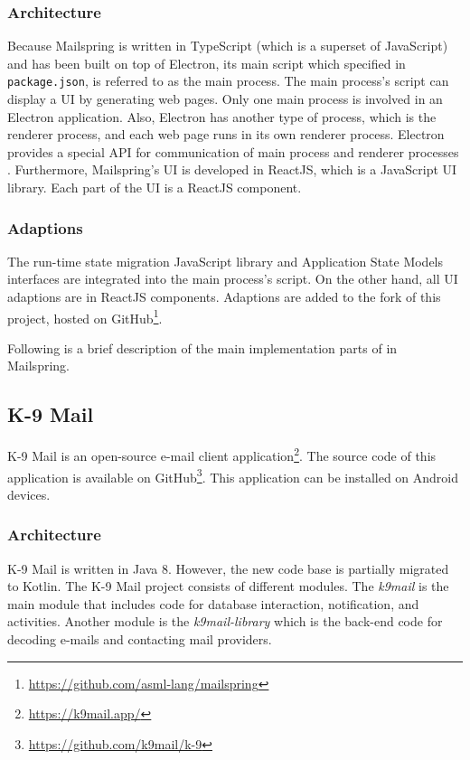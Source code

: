 \subsubsection{Architecture}
Because Mailspring is written in TypeScript (which is a superset of JavaScript) and has been built on top of Electron, its main script which specified in \lstinline[basicstyle=\ttfamily]{package.json}, is referred to as the main process. The main process's script can display a UI by generating web pages. Only one main process is involved in an Electron application. Also, Electron has another type of process, which is the renderer process, and each web page runs in its own renderer process. Electron provides a special API for communication of main process and renderer processes \cite{electron}. Furthermore, Mailspring's UI is developed in ReactJS, which is a JavaScript UI library. Each part of the UI is a ReactJS component.

\subsubsection{Adaptions}
The run-time state migration JavaScript library and Application State Models interfaces are integrated into the main process's script. On the other hand, all UI adaptions are in ReactJS components. Adaptions are added to the fork of this project, hosted on GitHub\footnote{\url{https://github.com/asml-lang/mailspring}}. 

Following is a brief description of the main implementation parts of in Mailspring.



\subsection{K-9 Mail}
K-9 Mail is an open-source e-mail client application\footnote{\url{https://k9mail.app/}}. The source code of this application is available on GitHub\footnote{\url{https://github.com/k9mail/k-9}}. This application can be installed on Android devices.

\subsubsection{Architecture}
K-9 Mail is written in Java 8. However, the new code base is partially migrated to Kotlin. The K-9 Mail project consists of different modules. The \textit{k9mail} is the main module that includes code for database interaction, notification, and activities. Another module is the \textit{k9mail-library} which is the back-end code for decoding e-mails and contacting mail providers. 

